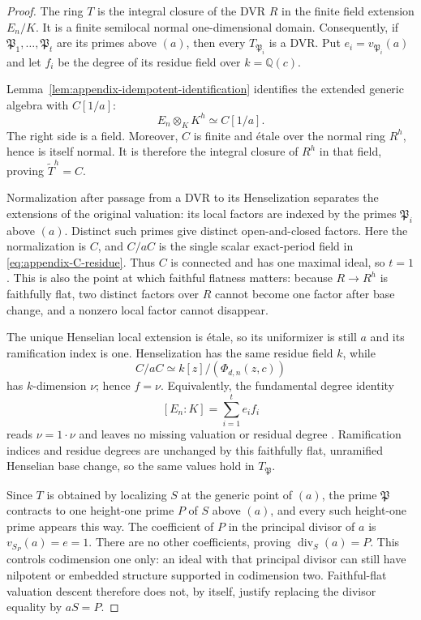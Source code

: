\documentclass[11pt]{article}
\theoremstyle{definition}
\theoremstyle{remark}
\newcommand{\Q}{\mathbb{Q}}
\newcommand{\divisor}{\operatorname{div}}
\newcommand{\etale}{\'{e}tale}
\begin{document}
\begin{proof}
The ring $T$ is the integral closure of the DVR $R$ in the finite field
extension $E_n/K$.  It is a finite semilocal normal one-dimensional domain.
Consequently, if
$\mathfrak P_1,\ldots,\mathfrak P_t$ are its primes above $(a)$, then every
$T_{\mathfrak P_i}$ is a DVR.  Put $e_i=v_{\mathfrak P_i}(a)$ and let $f_i$
be the degree of its residue field over $k=\Q(c)$.

Lemma~\ref{lem:appendix-idempotent-identification} identifies the extended
generic algebra with $C[1/a]$:
\[
 E_n\otimes_KK^h\simeq C[1/a].
\]
The right side is a field.  Moreover, $C$ is finite and \etale{} over the
normal ring $R^h$, hence is itself normal.  It is therefore the integral
closure of $R^h$ in that field, proving $\widetilde T^h=C$.

Normalization after passage from a DVR to its Henselization separates the
extensions of the original valuation: its local factors are indexed by the
primes $\mathfrak P_i$ above $(a)$.  Distinct such primes give distinct
open-and-closed factors.  Here the normalization is $C$, and
$C/aC$ is the single scalar exact-period field in
\eqref{eq:appendix-C-residue}.  Thus $C$ is connected and has one maximal
ideal, so $t=1$.  This is also the point at which faithful flatness matters:
because $R\to R^h$ is faithfully flat, two distinct factors over $R$ cannot
become one factor after base change, and a nonzero local factor cannot
disappear.

The unique Henselian local extension is \etale, so its uniformizer is still
$a$ and its ramification index is one.  Henselization has the same residue
field $k$, while 
\[
 C/aC\simeq k[z]/(\Phi_{d,n}(z,c))
\]
has $k$-dimension $\nu$; hence $f=\nu$.  Equivalently, the fundamental
degree identity
\[
 [E_n:K]=\sum_{i=1}^{t}e_if_i
\]
reads $\nu=1\cdot\nu$ and leaves no missing valuation or residual degree
\citep{stacks-09e4,stacks-09e8}.  Ramification indices and residue degrees
are unchanged by this faithfully flat, unramified Henselian base change, so
the same values hold in $T_{\mathfrak P}$.

Since $T$ is obtained by localizing $S$ at the generic point of $(a)$, the
prime $\mathfrak P$ contracts to one height-one prime $P$ of $S$ above
$(a)$, and every such height-one prime appears this way.  The coefficient of
$P$ in the principal divisor of $a$ is
$v_{S_P}(a)=e=1$.  There are no other coefficients, proving
$\divisor_S(a)=P$.  This controls codimension one only: an ideal with that
principal divisor can still have nilpotent or embedded structure supported
in codimension two.  Faithful-flat valuation descent therefore does not, by
itself, justify replacing the divisor equality by $aS=P$.
\end{proof}
\end{document}
